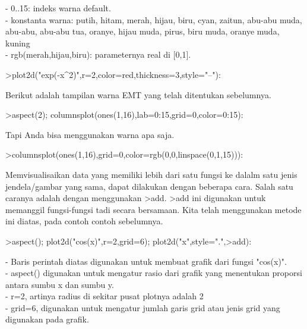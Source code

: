 \documentclass[a4paper,10pt]{article}
\begin{document}
\begin{eulernotebook}
\begin{eulercomment}
\begin{eulercomment}
\begin{eulercomment}
\begin{eulercomment}
\begin{eulercomment}
\begin{eulercomment}
\begin{eulercomment}
- 0..15: indeks warna default.\\
- konstanta warna: putih, hitam, merah, hijau, biru, cyan, zaitun,
abu-abu muda, abu-abu, abu-abu tua, oranye, hijau muda, pirus, biru
muda, oranye muda, kuning\\
- rgb(merah,hijau,biru): parameternya real di [0,1].
\end{eulercomment}
\begin{eulerprompt}
>plot2d("exp(-x^2)",r=2,color=red,thickness=3,style="--"):
\end{eulerprompt}
\begin{eulercomment}
Berikut adalah tampilan warna EMT yang telah ditentukan sebelumnya.
\end{eulercomment}
\begin{eulerprompt}
>aspect(2); columnsplot(ones(1,16),lab=0:15,grid=0,color=0:15):
\end{eulerprompt}
\begin{eulercomment}
Tapi Anda bisa menggunakan warna apa saja.
\end{eulercomment}
\begin{eulerprompt}
>columnsplot(ones(1,16),grid=0,color=rgb(0,0,linspace(0,1,15))):
\end{eulerprompt}
\begin{eulercomment}
Memvisualisaikan data yang memiliki lebih dari satu fungsi ke dalalm
satu jenis jendela/gambar yang sama, dapat dilakukan dengan beberapa
cara. Salah satu caranya adalah dengan menggunakan \textgreater{}add. \textgreater{}add ini
digunakan untuk memanggil fungsi-fungsi tadi secara bersamaan. Kita
telah menggunakan metode ini diatas, pada contoh contoh sebelumnya.
\end{eulercomment}
\begin{eulerprompt}
>aspect(); plot2d("cos(x)",r=2,grid=6); plot2d("x",style=".",>add):
\end{eulerprompt}
\begin{eulercomment}
- Baris perintah diatas digunakan untuk membuat grafik dari fungsi
"cos(x)".\\
- aspect() digunakan untuk mengatur rasio dari grafik yang menentukan
proporsi antara sumbu x dan sumbu y.\\
- r=2, artinya radius di sekitar pusat plotnya adalah 2\\
- grid=6, digunakan untuk mengatur jumlah garis grid atau jenis grid
yang digunakan pada grafik.


\end{eulercomment}
\end{eulercomment}
\end{eulercomment}
\end{eulercomment}
\end{eulercomment}
\end{eulercomment}
\end{eulercomment}
\end{eulernotebook}
\end{document}
